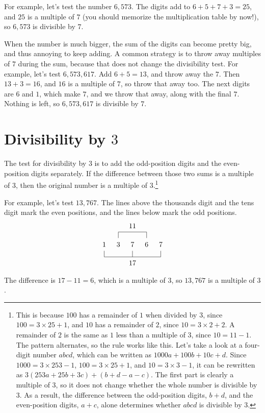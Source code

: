 For example, let's test the number $6{,}573$. The digits add to $6 + 5 + 7 + 3 = 25$, and $25$ is a multiple of $7$ (you should memorize the multiplication table by now!), so $6{,}573$ is divisible by $7$.

When the number is much bigger, the sum of the digits can become pretty big, and thus annoying to keep adding. A common strategy is to throw away multiples of $7$ during the sum, because that does not change the divisibility test. For example, let's test $6{,}573{,}617$. Add $6 + 5 = 13$, and throw away the $7$. Then $13 + 3 = 16$, and $16$ is a multiple of $7$, so throw that away too. The next digits are $6$ and $1$, which make $7$, and we throw that away, along with the final $7$. Nothing is left, so $6{,}573{,}617$ is divisible by $7$.

\section{Divisibility by $3$}

The test for divisibility by $3$ is to add the odd-position digits and the even-position digits separately. If the difference between those two sums is a multiple of $3$, then the original number is a multiple of $3$.\footnote{This is because $100$ has a remainder of $1$ when divided by $3$, since $100 = 3 \times 25 + 1$, and $10$ has a remainder of $2$, since $10 = 3 \times 2 + 2$. A remainder of $2$ is the same as $1$ less than a multiple of $3$, since $10 = 11 - 1$. The pattern alternates, so the rule works like this. Let's take a look at a four-digit number $abcd$, which can be written as $1000a + 100b + 10c + d$. Since $1000 = 3 \times 253 - 1$, $100 = 3 \times 25 + 1$, and $10 = 3 \times 3 - 1$, it can be rewritten as $3(253a + 25b + 3c) + (b + d - a - c)$. The first part is clearly a multiple of $3$, so it does not change whether the whole number is divisible by $3$. As a result, the difference between the odd-position digits, $b + d$, and the even-position digits, $a + c$, alone determines whether $abcd$ is divisible by $3$.}

For example, let's test $13{,}767$. The lines above the thousands digit and the tens digit mark the even positions, and the lines below mark the odd positions.
\[
  \setlength{\unitlength}{1em}
  \begin{picture}(8.8,6.4)(-0.4,-3.2)
    \put(0,0){\makebox(0,0){$1$}}
    \put(2,0){\makebox(0,0){$3$}}
    \put(4,0){\makebox(0,0){$7$}}
    \put(6,0){\makebox(0,0){$6$}}
    \put(8,0){\makebox(0,0){$7$}}
    \put(2,0.9){\line(0,1){0.85}}
    \put(6,0.9){\line(0,1){0.85}}
    \put(2,1.75){\line(1,0){4}}
    \put(4,2.6){\makebox(0,0){$11$}}
    \put(0,-0.9){\line(0,-1){0.85}}
    \put(4,-0.9){\line(0,-1){0.85}}
    \put(8,-0.9){\line(0,-1){0.85}}
    \put(0,-1.75){\line(1,0){8}}
    \put(4,-2.6){\makebox(0,0){$17$}}
  \end{picture}
\]
The difference is $17 - 11 = 6$, which is a multiple of $3$, so $13{,}767$ is a multiple of $3$.

